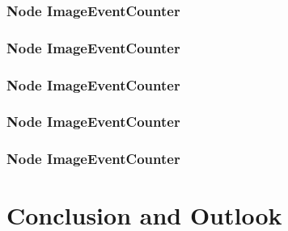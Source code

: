 \documentclass[aspectratio=169]{beamer}
\begin{document}
\begin{frame}
 \frametitle{Node ImageEventCounter}
 \lstOne
\end{frame}

\begin{frame}
 \frametitle{Node ImageEventCounter}
 \lstTwo
\end{frame}

\begin{frame}
 \frametitle{Node ImageEventCounter}
 \lstThree
\end{frame}

\begin{frame}
 \frametitle{Node ImageEventCounter}
 \lstFour
\end{frame}

\begin{frame}
 \frametitle{Node ImageEventCounter}
 \lstFive
\end{frame}

\section{Conclusion and Outlook}
\end{document}
